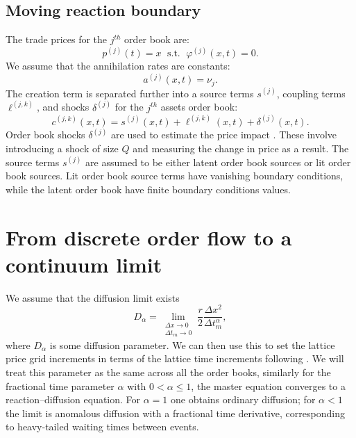 \documentclass[5p,final]{elsarticle}
\newcommand{\mlmm}{\lim_{\substack{\Delta x \rightarrow 0 \\ \Delta t_m \rightarrow 0}}}
\begin{document}
\subsection{Moving reaction boundary}

The trade prices for the $j^{th}$ order book are:
\begin{equation}
p^{(j)}(t) = {{x} \,\, \operatorname{s.t.}\,\,  \varphi^{(j)}(x,t)=0}.
\end{equation}
We assume that the annihilation rates are constants:
\begin{equation}
a^{(j)}(x,t)=\nu_j.
\end{equation}
The creation term is separated further into a source terms $s^{(j)}$, coupling terms $\ell^{(j,k)}$, and shocks $\delta^{(j)}$ for the $j^{th}$ assets order book:
\begin{equation}
c^{(j,k)}(x,t)=s^{(j)}(x,t)+\ell^{(j,k)}(x,t)+ \delta^{(j)}(x,t).
\end{equation}
Order book shocks $\delta^{(j)}$ are used to estimate the price impact \citep{DianaGebbie2025}. These involve introducing a shock of size $Q$ and measuring the change in price as a result. The source terms $s^{(j)}$ are assumed to be either latent order book sources or lit order book sources. Lit order book source terms have vanishing boundary conditions, while the latent order book have finite boundary conditions values. 


\section{From discrete order flow to a continuum limit}

We assume that the diffusion limit exists 
\begin{equation}\label{eq:d}
    D_{\alpha} = \mlmm  \frac{r}{2}\frac{\Delta x^2}{\Delta t_m^{\alpha}},
\end{equation}
where $D_{\alpha}$ is some diffusion parameter. We can then use this to set the lattice price grid increments in terms of the lattice time increments following \citet{DianaGebbie2025}. We will treat this parameter as the same across all the order books, similarly for the fractional time parameter $\alpha$ with $0<\alpha\le 1$, the master equation converges to a reaction--diffusion equation. For $\alpha=1$ one obtains ordinary diffusion; for $\alpha<1$ the limit is anomalous diffusion with a
fractional time derivative, corresponding to heavy-tailed waiting times between events.
\end{document}
